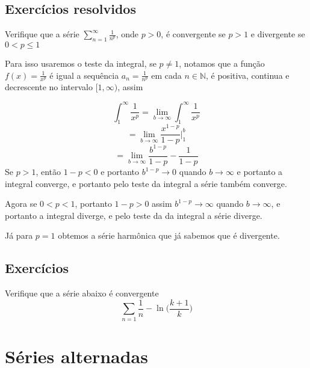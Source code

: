 \subsection*{Exercícios resolvidos}

\construirExeresol
\begin{exeresol}
    Verifique que a série $\sum_{n = 1}^{\infty} \frac{1}{n^p}$, onde $p>0$, é
    convergente se $p>1$ e divergente se $0 < p \leq 1$ 
\end{exeresol}

\begin{resol}
    Para isso usaremos o teste da integral, se $p\neq 1$, notamos que a função 
    $f(x) = \frac{1}{x^p}$ é igual a sequência $a_n = \frac{1}{n^p}$ em cada 
    $n \in \mathbb{N}$, é positiva, continua e decrescente no intervalo $[1, \infty)$,
    assim

    $$\int_1^{\infty} \frac{1}{x^p} = \lim_{b \rightarrow \infty} \int_1^{\infty} 
    \frac{1}{x^p}$$
    $$ = \lim_{b \rightarrow \infty} \frac{x^{1-p}}{1-p}\bigg|_{1}^b$$
    $$ = \lim_{b \rightarrow \infty} \frac{b^{1-p}}{1-p} -\frac{1}{1-p}$$
    Se $p>1$, então $1-p<0$ e portanto $b^{1-p} \to 0$ quando $b \to \infty$
    e portanto a integral converge, e portanto pelo teste da integral a série
    também converge.

    Agora se $0 < p<1$, portanto $1-p>0$ assim $b^{1-p} \to \infty$ quando 
    $b \to \infty$, e portanto a integral diverge, e pelo teste da da integral
    a série diverge.
    
    Já para $p = 1$ obtemos a série harmônica que já sabemos que é divergente.
\end{resol}


\subsection*{Exercícios}

\construirExer

\begin{exer}
    Verifique que a série abaixo é convergente
    $$\sum_{n = 1} \frac{1}{n}-\ln \bigg(\frac{k+1}{k} \bigg) $$
\end{exer}


\section{Séries alternadas}
\construirSec

